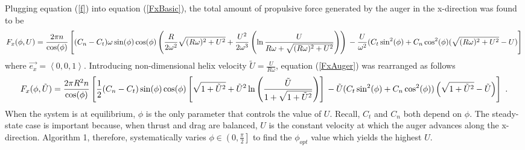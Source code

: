 \documentclass[letterpaper, 11 pt]{article}
\begin{document}
Plugging equation (\ref{f}) into equation (\ref{FxBasic}), the total amount of propulsive force generated by the auger in the x-direction was found to be  
\begin{dmath}\label{FxAuger}
F_x(\phi,U) = \frac{2\pi n}{\cos(\phi)}\left[(C_n-C_t)\omega\sin(\phi)\cos(\phi)\left( \frac{R}{2\omega^2}\sqrt{(R\omega)^2+U^2}+\frac{U^2}{2\omega^3}\left( \ln\frac{U}{R\omega+\sqrt{(R\omega)^2+U^2}}\right) \right) \\
- \frac{U}{\omega^2}(C_t\sin^2(\phi)+C_n\cos^2(\phi)(\sqrt{(R\omega)^2+U^2}-U) \right] 
\end{dmath}
where $\vec{e_x} = \left\langle 0,0,1 \right\rangle $. Introducing non-dimensional helix velocity $\tilde{U} = \frac{U}{R\omega}$, equation (\ref{FxAuger}) was rearranged as follows
\begin{dmath}\label{NDFxAuger}
F_x(\phi, \tilde{U}) = \frac{2\pi R^2n}{\cos(\phi)}\left[\frac{1}{2}(C_n-C_t)\sin(\phi)\cos(\phi)\left[\sqrt{1+\tilde{U}^2}+\tilde{U}^2\ln\left(\frac{\tilde{U}}{1+\sqrt{1+\tilde{U}^2}} \right)  \right] \\
- \tilde{U}(C_t\sin^2(\phi)+C_n\cos^2(\phi))\left(\sqrt{1+\tilde{U}^2}-\tilde{U}\right) \right]\ \text{.} 
\end{dmath}
When the system is at equilibrium, $\phi$ is the only parameter that controls the value of $U$. Recall, $C_t$ and $C_n$ both depend on $\phi$. The steady-state case is important because, when thrust and drag are balanced, $U$ is the constant velocity at which the auger advances along the x-direction. Algorithm 1, therefore, systematically varies $\phi\in\left(0,\frac{\pi}{2} \right] $ to find the $\phi_{opt}$ value which yields the highest $U$.  
\end{document}
